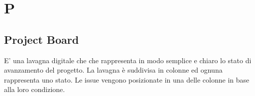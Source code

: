 \section{P}
\subsection{Project Board}%
E' una lavagna digitale che che rappresenta in modo semplice e chiaro lo stato di avanzamento del progetto. La lavagna è suddivisa in colonne ed ognuna rappresenta uno stato.  Le issue vengono posizionate in una delle colonne in base alla loro condizione.
\clearpage
